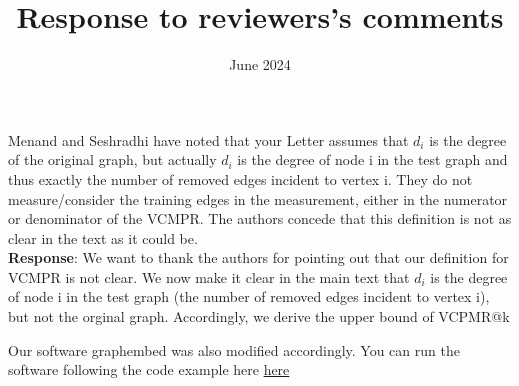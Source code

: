 \documentclass{article}
\title{Response to reviewers's comments}
\date{June 2024}
\begin{document}
\maketitle

Menand and Seshradhi have noted that your Letter assumes that $d_i$ 
is the degree of the original graph, but actually $d_i$ is the degree 
of node i in the test graph and thus exactly the number of removed 
edges incident to vertex i. They do not measure/consider the training 
edges in the measurement, either in the numerator or denominator of the VCMPR. 
The authors concede that this definition is not as clear in the text as it could be.\\

\textbf{Response}: We want to thank the authors for pointing out that our definition for VCMPR is not clear.
We now make it clear in the main text that $d_i$ is the degree 
of node i in the test graph (the number of removed 
edges incident to vertex i), but not the orginal graph. Accordingly, we derive the upper bound of VCPMR@k

Our software graphembed was also modified accordingly. You can run the software following the code example here \href{https://github.com/jean-pierreBoth/linkauc/blob/master/running_graphembed.md}{\color{blue}here}


\end{document}
